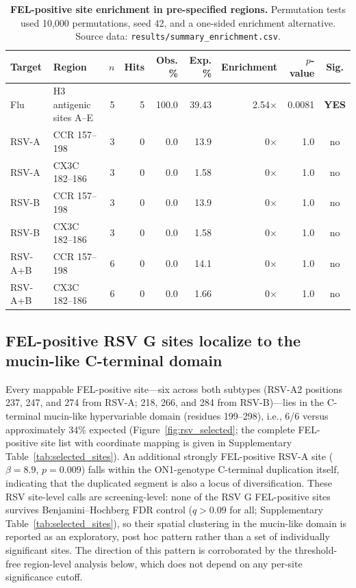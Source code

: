 \documentclass[11pt]{article}
\newcommand{\yes}{\textbf{YES}}
\begin{document}
\begin{table}[H]
\centering
\scriptsize
\setlength{\tabcolsep}{3pt}
\caption{\textbf{FEL-positive site enrichment in pre-specified regions.} Permutation tests used 10,000 permutations, seed 42, and a one-sided enrichment alternative. Source data: \texttt{results/summary\_enrichment.csv}.}
\label{tab:enrichment}
\begin{tabular}{llrrrrrrc}
\toprule
Target & Region & $n$ & Hits & Obs. \% & Exp. \% & Enrichment & $p$-value & Sig. \\
\midrule
Flu & H3 antigenic sites A--E & 5 & 5 & 100.0 & 39.43 & 2.54$\times$ & 0.0081 & \yes \\
RSV-A & CCR 157--198 & 3 & 0 & 0.0 & 13.9 & 0$\times$ & 1.0 & no \\
RSV-A & CX3C 182--186 & 3 & 0 & 0.0 & 1.58 & 0$\times$ & 1.0 & no \\
RSV-B & CCR 157--198 & 3 & 0 & 0.0 & 13.9 & 0$\times$ & 1.0 & no \\
RSV-B & CX3C 182--186 & 3 & 0 & 0.0 & 1.58 & 0$\times$ & 1.0 & no \\
RSV-A+B & CCR 157--198 & 6 & 0 & 0.0 & 14.1 & 0$\times$ & 1.0 & no \\
RSV-A+B & CX3C 182--186 & 6 & 0 & 0.0 & 1.66 & 0$\times$ & 1.0 & no \\
\bottomrule
\end{tabular}
\end{table}

\subsection{FEL-positive RSV G sites localize to the mucin-like C-terminal domain}

Every mappable FEL-positive site---six across both subtypes (RSV-A2 positions 237, 247, and 274 from RSV-A; 218, 266, and 284 from RSV-B)---lies in the C-terminal mucin-like hypervariable domain (residues 199--298), i.e., 6/6 versus approximately 34\% expected (Figure~\ref{fig:rsv_selected}; the complete FEL-positive site list with coordinate mapping is given in Supplementary Table~\ref{tab:selected_sites}). An additional strongly FEL-positive RSV-A site ($\beta=8.9$, $p=0.009$) falls within the ON1-genotype C-terminal duplication itself, indicating that the duplicated segment is also a locus of diversification. These RSV site-level calls are screening-level: none of the RSV G FEL-positive sites survives Benjamini--Hochberg FDR control ($q>0.09$ for all; Supplementary Table~\ref{tab:selected_sites}), so their spatial clustering in the mucin-like domain is reported as an exploratory, post hoc pattern rather than a set of individually significant sites. The direction of this pattern is corroborated by the threshold-free region-level analysis below, which does not depend on any per-site significance cutoff.
\end{document}
